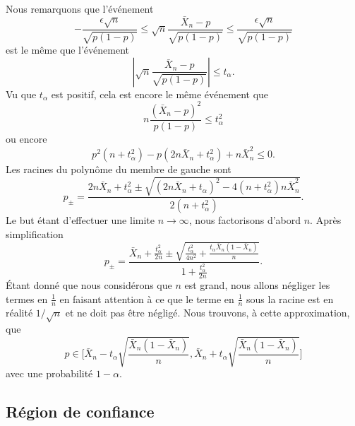 \begin{description}
		Nous remarquons que l'événement
		\begin{equation}
			-\frac{ \epsilon\sqrt{n} }{ \sqrt{p(1-p)} }\leq \sqrt{n}\frac{ \bar X_n-p }{ \sqrt{p(1-p)} }\leq \frac{ \epsilon\sqrt{n} }{ \sqrt{p(1-p)} }
		\end{equation}
		est le même que l'événement
		\begin{equation}
			\left| \sqrt{n}\frac{ \bar X_n-p }{ \sqrt{p(1-p)} } \right| \leq t_{\alpha}.
		\end{equation}
		Vu que \( t_{\alpha}\) est positif, cela est encore le même événement que
		\begin{equation}
			n\frac{ (\bar X_n-p)^2 }{ p(1-p) }\leq t_{\alpha}^2
		\end{equation}
		ou encore
		\begin{equation}
			p^2(n+t_{\alpha}^2)-p(2n\bar X_n+t_{\alpha}^2)+n\bar X_n^2\leq 0.
		\end{equation}
		Les racines du polynôme du membre de gauche sont
		\begin{equation}
			p_{\pm}=\frac{ 2n\bar X_n+t_{\alpha}^2\pm\sqrt{ (2n\bar X_n+t_{\alpha})^2-4(n+t_{\alpha}^2)n\bar X_n^2  } }{ 2(n+t_{\alpha}^2) }.
		\end{equation}
		Le but étant d'effectuer une limite \( n\to\infty\), nous factorisons d'abord \( n\). Après simplification
		\begin{equation}
			p_{\pm}=\frac{ \bar X_n+\frac{ t_{\alpha}^2 }{ 2n }\pm \sqrt{\frac{ t_{\alpha}^2 }{ 4n^2 }+\frac{ t_{\alpha} \bar X_n(1-\bar X_n) }{ n }} }{ 1+\frac{ t_{\alpha}^2 }{ 2n } }.
		\end{equation}
		Étant donné que nous considérons que \( n\) est grand, nous allons négliger les termes en \( \frac{1}{ n }\) en faisant attention à ce que le terme en \( \frac{1}{ n }\) sous la racine est en réalité \( 1/\sqrt{n}\) et ne doit pas être négligé. Nous trouvons, à cette approximation, que
		\begin{equation}
			p\in\mathopen\Big[  \bar X_n-t_{\alpha}\sqrt{\frac{ \bar X_n(1-\bar X_n) }{ n }}  , \bar X_n+t_{\alpha}\sqrt{\frac{ \bar X_n(1-\bar X_n) }{ n }} \mathclose\Big]
		\end{equation}
		avec une probabilité \( 1-\alpha\).

\end{description}

\subsection{Région de confiance}

